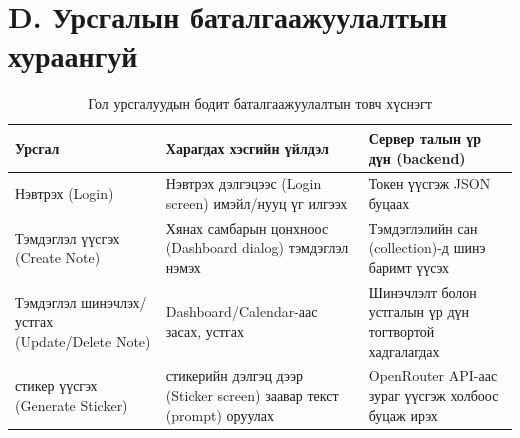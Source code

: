 \section*{D. Урсгалын баталгаажуулалтын хураангуй}

\begin{table}[H]
\centering
\caption{Гол урсгалуудын бодит баталгаажуулалтын товч хүснэгт}
\label{tab:appendix_flow_summary}
\small
\begin{tabular}{>{\raggedright\arraybackslash}p{3.6cm}>{\raggedright\arraybackslash}p{4.8cm}>{\raggedright\arraybackslash}p{4.5cm}}
\toprule
\textbf{Урсгал} & \textbf{Харагдах хэсгийн үйлдэл} & \textbf{Сервер талын үр дүн (backend)} \\
\midrule
Нэвтрэх (Login) & Нэвтрэх дэлгэцээс (Login screen) имэйл/нууц үг илгээх & Токен үүсгэж JSON буцаах \\
Тэмдэглэл үүсгэх (Create Note) & Хянах самбарын цонхноос (Dashboard dialog) тэмдэглэл нэмэх & Тэмдэглэлийн сан (collection)-д шинэ баримт үүсэх \\
Тэмдэглэл шинэчлэх/устгах (Update/Delete Note) & Dashboard/Calendar-аас засах, устгах & Шинэчлэлт болон устгалын үр дүн тогтвортой хадгалагдах \\
стикер үүсгэх (Generate Sticker) & стикерийн дэлгэц дээр (Sticker screen) заавар текст (prompt) оруулах & OpenRouter API-аас зураг үүсгэж холбоос буцаж ирэх \\
\bottomrule
\end{tabular}
\end{table}

